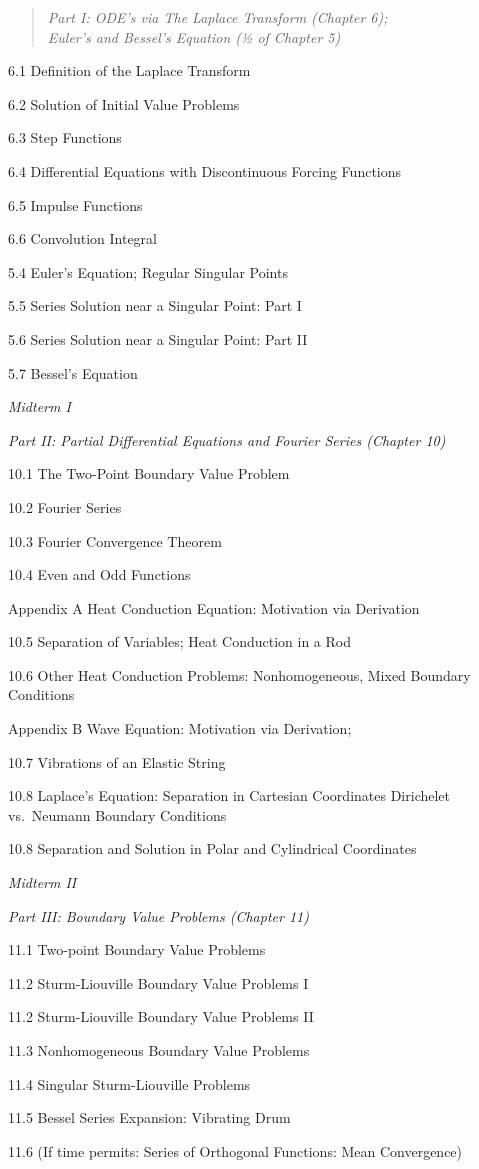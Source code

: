 \documentclass{osucourse}
\begin{document}
\begin{TopicsOutline}
\begin{quote}
\emph{Part I: ODE's via The Laplace Transform (Chapter 6);\\
Euler's and Bessel's Equation (½ of Chapter 5)}
\end{quote}

6.1 Definition of the Laplace Transform

6.2 Solution of Initial Value Problems

6.3 Step Functions

6.4 Differential Equations with Discontinuous Forcing Functions

6.5 Impulse Functions

6.6 Convolution Integral

5.4 Euler's Equation; Regular Singular Points

5.5 Series Solution near a Singular Point: Part I

5.6 Series Solution near a Singular Point: Part II

5.7 Bessel's Equation

\emph{Midterm I}

\emph{Part II: Partial Differential Equations and Fourier Series
(Chapter 10)}

10.1 The Two-Point Boundary Value Problem

10.2 Fourier Series

10.3 Fourier Convergence Theorem

10.4 Even and Odd Functions

Appendix A Heat Conduction Equation: Motivation via Derivation

10.5 Separation of Variables; Heat Conduction in a Rod

10.6 Other Heat Conduction Problems: Nonhomogeneous, Mixed Boundary
Conditions

Appendix B Wave Equation: Motivation via Derivation;

10.7 Vibrations of an Elastic String

10.8 Laplace's Equation: Separation in Cartesian Coordinates Dirichelet
vs.~Neumann Boundary Conditions

10.8 Separation and Solution in Polar and Cylindrical Coordinates

\emph{Midterm II}

\emph{Part III: Boundary Value Problems (Chapter 11)}

11.1 Two-point Boundary Value Problems

11.2 Sturm-Liouville Boundary Value Problems I

11.2 Sturm-Liouville Boundary Value Problems II

11.3 Nonhomogeneous Boundary Value Problems

11.4 Singular Sturm-Liouville Problems

11.5 Bessel Series Expansion: Vibrating Drum

11.6 (If time permits: Series of Orthogonal Functions: Mean Convergence)
\end{TopicsOutline}
\end{document}
